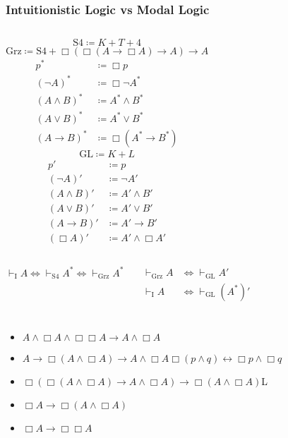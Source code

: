\documentclass[UTF8,aspectratio=43,11pt,colorlinks,compress,openany]{beamer}%
\begin{document}
\begin{frame}\frametitle{Intuitionistic Logic vs Modal Logic}
\setlength\abovedisplayskip{0pt}
	\begin{columns}
			\[\mathrm{S4}\coloneqq K+T+4\]
			\[\mathrm{Grz}\coloneqq \mathrm{S4}+\Box(\Box(A\to\Box A)\to A)\to A\]
			\begin{align*}
			p^*&\coloneqq \Box p\\
			(\neg A)^*&\coloneqq \Box\neg A^*\\
			(A\wedge B)^*&\coloneqq  A^*\wedge B^*\\
			(A\vee B)^*&\coloneqq  A^*\vee B^*\\
			(A\to B)^*&\coloneqq \Box(A^*\to B^*)
			\end{align*}
			\[\mathrm{GL}\coloneqq K+L\]
			\begin{align*}
			p'&\coloneqq p\\
			(\neg A)'&\coloneqq \neg A'\\
			(A\wedge B)'&\coloneqq  A'\wedge B'\\
			(A\vee B)'&\coloneqq  A'\vee B'\\
			(A\to B)'&\coloneqq  A'\to B'\\
			(\Box A)'&\coloneqq  A'\wedge\Box A'
			\end{align*}
	\end{columns}
	\begin{columns}
		\column{.5\textwidth}
			\begin{block}{}
				\[\vdash_{\mathrm{I}} A\iff\vdash_{\mathrm{S4}} A^*\iff\vdash_{\mathrm{Grz}} A^*\]
			\end{block}
		\column{.4\textwidth}
			\begin{block}{}
				\begin{align*}
				\vdash_{\mathrm{Grz}} A&\iff\vdash_{\mathrm{GL}} A'\\
				\vdash_{\mathrm{I}} A&\iff\vdash_{\mathrm{GL}}(A^*)'
				\end{align*}
			\end{block}
	\end{columns}
\end{frame}

\begin{frame}\frametitle{}
\centerline{}
\begin{itemize}
	\item $A\wedge\Box A\wedge\Box\Box A\to A\wedge\Box A$
	\item $A\to\Box(A\wedge\Box A)\to A\wedge\Box A$\hfill $\Box(p\wedge q)\leftrightarrow\Box p\wedge\Box q$
	\item $\Box(\Box (A\wedge\Box A)\to A\wedge\Box A)\to\Box(A\wedge\Box A)$\hfill L
	\item $\Box A\to\Box(A\wedge\Box A)$
	\item $\Box A\to\Box\Box A$
\end{itemize}
\end{frame}
\end{document}
